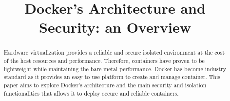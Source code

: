 \documentclass[conference]{IEEEtran}
\begin{document}
\title{Docker's Architecture and Security: an Overview}

\author{
}

\maketitle

\begin{abstract}
    Hardware virtualization provides a reliable and secure isolated environment at the cost of the host resources and performance. Therefore, containers have proven to be lightweight while maintaining the bare-metal performance. Docker has become industry standard as it provides an easy to use platform to create and manage container. This paper aims to explore Docker's architecture and the main security and isolation functionalities that allows it to deploy secure and reliable containers.




\end{abstract}
\end{document}

